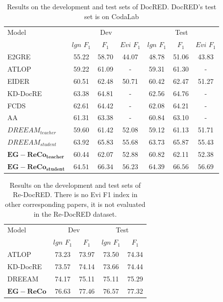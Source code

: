 \documentclass[preprint,12pt]{elsarticle}
\begin{document}
\begin{table}[h]
\centering
\caption{Results on the development and test sets of DocRED. DocRED's test set is on CodaLab}\label{tab2}
\begin{tabular*}{\textwidth}{@{\extracolsep\fill}lcccccc}
\hline
Model & \multicolumn{3}{c}{Dev} & \multicolumn{3}{c}{Test} \\
& $lgn$ $F_1$ & $F_1$ & $Evi$ $F_1$ & $lgn$ $F_1$ & $F_1$ & $Evi$ $F_1$ \\
\hline
E2GRE\cite{huang2021entity} & 55.22 & 58.70 & 44.07 & 48.78 & 51.06 & 43.83 \\
ATLOP\cite{zhou2021document} & 59.22 & 61.09 & - & 59.31 & 61.30 & - \\
EIDER\cite{xie-etal-2022-eider} & 60.51 & 62.48 & 50.71 & 60.42 & 62.47 & 51.27 \\
KD-DocRE\cite{tan-etal-2022-document} & 63.38 & 64.81 & - & 62.56 & 64.76 & - \\
FCDS\cite{zhu2024fcds} & 62.61 & 64.42 & - & 62.08 & 64.21 & - \\
AA\cite{lu-etal-2023-anaphor} & 61.31 & 63.38 & - & 60.84 & 63.10 & - \\
$DREEAM_{teacher}$\cite{ma-etal-2023-dreeam} & 59.60 & 61.42 & 52.08 & 59.12 & 61.13 & 51.71 \\
$DREEAM_{student}$\cite{ma-etal-2023-dreeam} & 63.92 & 65.83 & 55.68 & 63.73 & 65.87 & 55.43 \\
\hline
$\mathbf{EG-ReCo_{teacher}}$ & 60.44 & 62.07 & 52.88 & 60.82 & 62.11 & 52.38 \\
$\mathbf{EG-ReCo_{student}}$ & $\mathbf{64.51}$ & $\mathbf{66.34}$ & $\mathbf{56.23}$ & $\mathbf{64.39}$ & $\mathbf{66.56}$ & $\mathbf{56.69}$ \\
\hline
\end{tabular*}
\end{table}


\begin{table}[h]
\centering
\caption{Results on the development and test sets of Re-DocRED. There is no Evi F1 index in other corresponding papers, it is not evaluated in the Re-DocRED dataset.}\label{tab3}
\begin{tabular*}{\textwidth}{@{\extracolsep\fill}lcccc}
\hline
Model & \multicolumn{2}{c}{Dev} & \multicolumn{2}{c}{Test} \\
& $lgn$ $F_1$ & $F_1$ & $lgn$ $F_1$ & $F_1$ \\
\hline
ATLOP\cite{zhou2021document} & 73.23 & 73.97 & 73.50 & 74.34 \\
KD-DocRE\cite{tan-etal-2022-document} & 73.57 & 74.14 & 73.66 & 74.44 \\
DREEAM\cite{ma-etal-2023-dreeam} & 74.17 & 75.11 & 75.11 & 75.29 \\
$\mathbf{EG-ReCo}$ & $\mathbf{76.63}$ & $\mathbf{77.46}$ & $\mathbf{76.57}$ & $\mathbf{77.32}$ \\
\hline
\end{tabular*}
\end{table}
\end{document}
